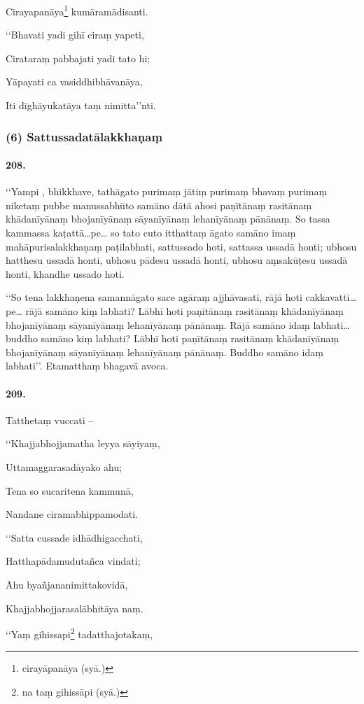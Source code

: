 Cirayapanāya\footnote{cirayāpanāya (syā.)} kumāramādisanti.

‘‘Bhavati yadi gihī ciraṃ yapeti,

Cirataraṃ pabbajati yadi tato hi;

Yāpayati ca vasiddhibhāvanāya,

Iti dīghāyukatāya taṃ nimitta’’nti.

\subsubsection{(6) Sattussadatālakkhaṇaṃ}

\paragraph{208.} ‘‘Yampi , bhikkhave, tathāgato purimaṃ jātiṃ purimaṃ bhavaṃ purimaṃ niketaṃ pubbe manussabhūto samāno dātā ahosi paṇītānaṃ rasitānaṃ khādanīyānaṃ bhojanīyānaṃ sāyanīyānaṃ lehanīyānaṃ pānānaṃ. So tassa kammassa kaṭattā…pe… so tato cuto itthattaṃ āgato samāno imaṃ mahāpurisalakkhaṇaṃ paṭilabhati, sattussado hoti, sattassa ussadā honti; ubhosu hatthesu ussadā honti, ubhosu pādesu ussadā honti, ubhosu aṃsakūṭesu ussadā honti, khandhe ussado hoti.

‘‘So tena lakkhaṇena samannāgato sace agāraṃ ajjhāvasati, rājā hoti cakkavattī…pe… rājā samāno kiṃ labhati? Lābhī hoti paṇītānaṃ rasitānaṃ khādanīyānaṃ bhojanīyānaṃ sāyanīyānaṃ lehanīyānaṃ pānānaṃ. Rājā samāno idaṃ labhati… buddho samāno kiṃ labhati? Lābhī hoti paṇītānaṃ rasitānaṃ khādanīyānaṃ bhojanīyānaṃ sāyanīyānaṃ lehanīyānaṃ pānānaṃ. Buddho samāno idaṃ labhati’’. Etamatthaṃ bhagavā avoca.

\paragraph{209.} Tatthetaṃ vuccati –

‘‘Khajjabhojjamatha leyya sāyiyaṃ,

Uttamaggarasadāyako ahu;

Tena so sucaritena kammunā,

Nandane ciramabhippamodati.

‘‘Satta cussade idhādhigacchati,

Hatthapādamudutañca vindati;

Āhu byañjananimittakovidā,

Khajjabhojjarasalābhitāya naṃ.

‘‘Yaṃ gihissapi\footnote{na taṃ gihissāpi (syā.)} tadatthajotakaṃ,

